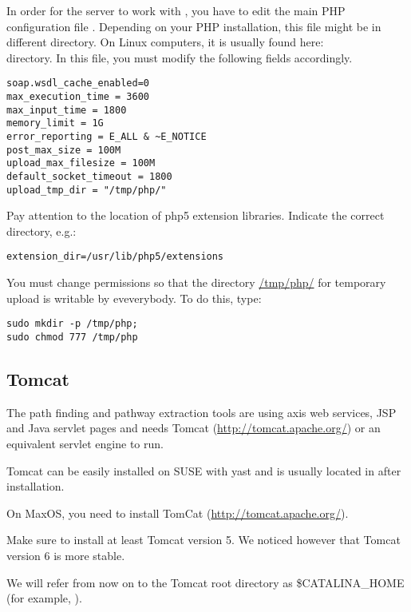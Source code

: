 \documentclass{book}
\begin{document}
In order for the server to work with \neat, you have to edit the main
PHP configuration file . Depending on your PHP
installation, this file might be in different directory. On Linux
computers, it is usually found here: \\
directory. In this file, you must modify the following fields
accordingly.

\begin{lstlisting}
soap.wsdl_cache_enabled=0
max_execution_time = 3600
max_input_time = 1800
memory_limit = 1G
error_reporting = E_ALL & ~E_NOTICE
post_max_size = 100M
upload_max_filesize = 100M
default_socket_timeout = 1800
upload_tmp_dir = "/tmp/php/"
\end{lstlisting}

Pay attention to the location of php5 extension libraries. Indicate
the correct directory, e.g.:

\begin{lstlisting}
extension_dir=/usr/lib/php5/extensions
\end{lstlisting}

You must change permissions so that the directory \url{/tmp/php/} for
temporary upload is writable by eveverybody. To do this, type:

\begin{lstlisting}
sudo mkdir -p /tmp/php; 
sudo chmod 777 /tmp/php
\end{lstlisting}


\subsection{Tomcat}

The path finding and pathway extraction tools are using axis web
services, JSP and Java servlet pages and needs Tomcat
(\url{http://tomcat.apache.org/}) or an equivalent servlet engine to
run.  

Tomcat can be easily installed on SUSE with yast and is usually
located in  after installation.

On MaxOS, you need to install TomCat
(\url{http://tomcat.apache.org/}).

Make sure to install at least Tomcat version 5.  We noticed however
that Tomcat version 6 is more stable.  

We will refer from now on to the Tomcat root directory as
\$CATALINA\_HOME (for example, ).
\end{document}
